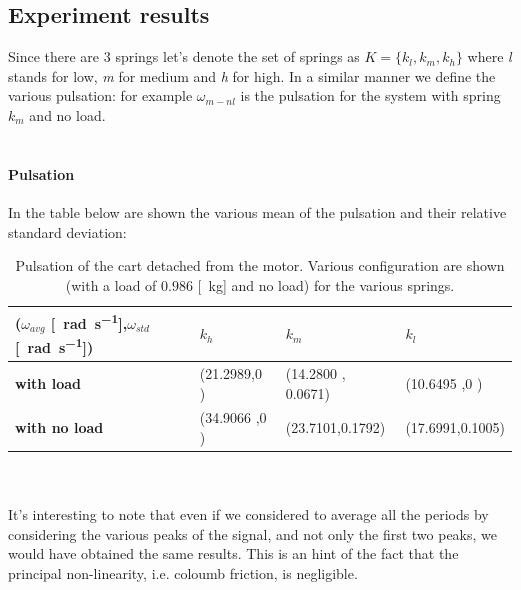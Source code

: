 \subsection{Experiment results}
Since there are $3$ springs let's denote the set of springs as $K=\{k_l, k_m, k_h\}$ where \emph{l} stands for low, \emph{m} for medium and \emph{h} for high. In a similar manner we define the various pulsation: for example $\omega_{m-nl}$ is the pulsation for the system with spring $k_m$ and no load.
\\ \\ 
\paragraph{Pulsation}
In the table below are shown the various mean of the pulsation and their relative standard deviation:
\begin{table}[!h]
\centering

\label{table: cart_detached_omega}
\begin{tabular}{|l|l|l|l|}
\hline
{(\textbf{$\omega_{avg}$} [\SI{}{\radian \per \second}],$\omega_{std}$ [\SI{}{\radian \per \second}])} & \textbf{$k_h$} & \textbf{$k_m$}   & \textbf{$k_l$}   \\ \hline
\textbf{with load}         & (21.2989,0 )    & (14.2800 ,    0.0671) & (10.6495 ,0 )      \\ \hline
\textbf{with no load}      & (34.9066 ,0 )    & (23.7101,0.1792) & (17.6991,0.1005) \\ \hline
\end{tabular}
\caption{Pulsation of the cart detached from the motor. Various configuration are shown (with a load of $0.986$ [\SI{}{\kilo \gram}] and no load) for the various springs. }
\end{table} \\ \\
It's interesting to note that even if we considered to average all the periods by considering the various peaks of the signal, and not only the first two peaks, we would have obtained the same results. This is an hint of the fact that the principal non-linearity, i.e. coloumb friction, is negligible.

